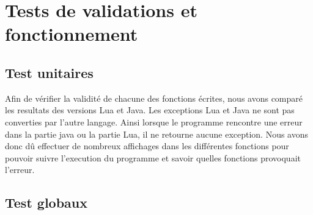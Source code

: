 \section{Tests de validations et fonctionnement}

\subsection{Test unitaires}

Afin de vérifier la validité de chacune des fonctions écrites, nous avons comparé les resultats des versions Lua et Java. Les exceptions Lua et Java ne sont pas converties par l'autre langage. Ainsi lorsque le programme rencontre une erreur dans la partie java ou la partie Lua, il ne retourne aucune exception. Nous avons donc dû effectuer de nombreux affichages dans les différentes fonctions pour pouvoir suivre l'execution du programme et savoir quelles fonctions provoquait l'erreur. 

\subsection{Test globaux}

